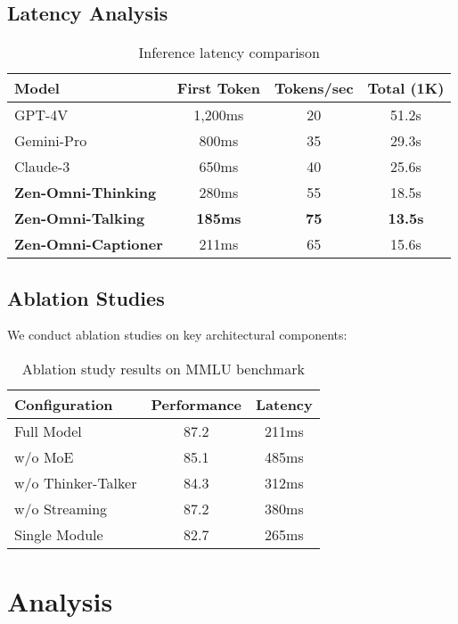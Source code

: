 \documentclass{article}
\begin{document}
\subsection{Latency Analysis}

\begin{table}[h]
\centering
\begin{tabular}{lccc}
\toprule
\textbf{Model} & \textbf{First Token} & \textbf{Tokens/sec} & \textbf{Total (1K)} \\
\midrule
GPT-4V & 1,200ms & 20 & 51.2s \\
Gemini-Pro & 800ms & 35 & 29.3s \\
Claude-3 & 650ms & 40 & 25.6s \\
\midrule
\textbf{Zen-Omni-Thinking} & 280ms & 55 & 18.5s \\
\textbf{Zen-Omni-Talking} & \textbf{185ms} & \textbf{75} & \textbf{13.5s} \\
\textbf{Zen-Omni-Captioner} & 211ms & 65 & 15.6s \\
\bottomrule
\end{tabular}
\caption{Inference latency comparison}
\end{table}

\subsection{Ablation Studies}

We conduct ablation studies on key architectural components:

\begin{table}[h]
\centering
\begin{tabular}{lcc}
\toprule
\textbf{Configuration} & \textbf{Performance} & \textbf{Latency} \\
\midrule
Full Model & 87.2 & 211ms \\
w/o MoE & 85.1 & 485ms \\
w/o Thinker-Talker & 84.3 & 312ms \\
w/o Streaming & 87.2 & 380ms \\
Single Module & 82.7 & 265ms \\
\bottomrule
\end{tabular}
\caption{Ablation study results on MMLU benchmark}
\end{table}

\section{Analysis}
\end{document}
